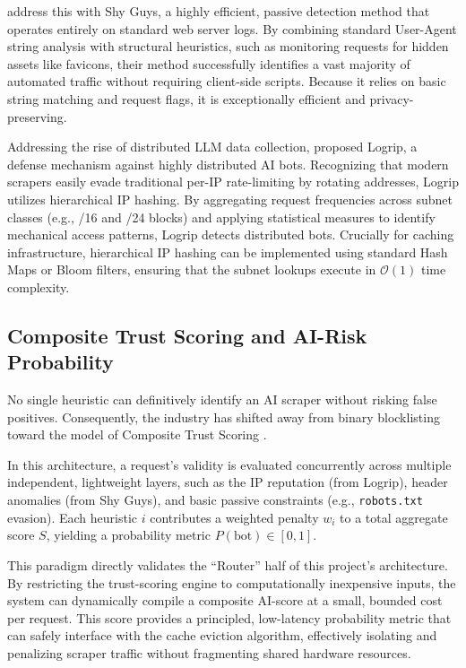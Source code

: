  address this with Shy Guys, a highly efficient, passive detection method that operates entirely on standard web server logs. By combining standard User-Agent string analysis with structural heuristics, such as monitoring requests for hidden assets like favicons, their method successfully identifies a vast majority of automated traffic without requiring client-side scripts. Because it relies on basic string matching and request flags, it is exceptionally efficient and privacy-preserving.

Addressing the rise of distributed LLM data collection,  proposed Logrip, a defense mechanism against highly distributed AI bots. Recognizing that modern scrapers easily evade traditional per-IP rate-limiting by rotating addresses, Logrip utilizes hierarchical IP hashing. By aggregating request frequencies across subnet classes (e.g., /16 and /24 blocks) and applying statistical measures to identify mechanical access patterns, Logrip detects distributed bots. Crucially for caching infrastructure, hierarchical IP hashing can be implemented using standard Hash Maps or Bloom filters, ensuring that the subnet lookups execute in $\mathcal{O}(1)$ time complexity.

\subsection{Composite Trust Scoring and AI-Risk Probability}
No single heuristic can definitively identify an AI scraper without risking false positives. Consequently, the industry has shifted away from binary blocklisting toward the model of Composite Trust Scoring \cite{chandra_composite_2026}.

In this architecture, a request’s validity is evaluated concurrently across multiple independent, lightweight layers, such as the IP reputation (from Logrip), header anomalies (from Shy Guys), and basic passive constraints (e.g., \texttt{robots.txt} evasion). Each heuristic $i$ contributes a weighted penalty $w_i$ to a total aggregate score $S$, yielding a probability metric $P(\text{bot}) \in [0, 1]$.

This paradigm directly validates the ``Router'' half of this project’s architecture. By restricting the trust-scoring engine to computationally inexpensive inputs, the system can dynamically compile a composite AI-score at a small, bounded cost per request. This score provides a principled, low-latency probability metric that can safely interface with the cache eviction algorithm, effectively isolating and penalizing scraper traffic without fragmenting shared hardware resources.

